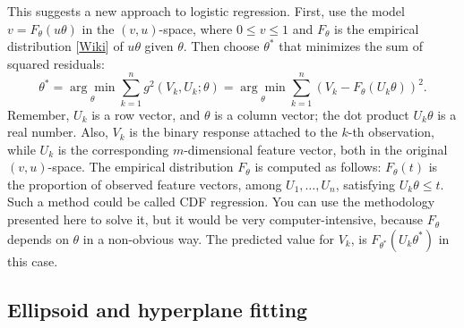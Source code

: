 \documentclass[oneside,10pt]{book}
\begin{document}
This suggests a new approach to logistic regression. First, use the model $v=F_\theta(u\theta)$ in the $(v,u)$-space, where $0\leq v\leq 1$ and 
$F_\theta$ is the
 \textcolor{index}{empirical distribution} [\href{https://en.wikipedia.org/wiki/Empirical_distribution_function}{Wiki}] of $u\theta$ given $\theta$. Then choose $\theta^*$ that minimizes the sum of squared residuals:
$$
\theta^* =\underset{\theta}{\arg\min}\sum_{k=1}^n g^2(V_k,U_k;\theta)=\underset{\theta}{\arg\min}\sum_{k=1}^n (V_k - F_\theta(U_k\theta))^2.
$$
 Remember, $U_k$ is a row vector, and $\theta$ is a column vector; the dot product $U_k\theta$ is a real number. Also,
 $V_k$ is the binary response attached to the $k$-th observation, while $U_k$ is the corresponding $m$-dimensional feature vector, both in the original 
 $(v,u)$-space. The empirical distribution $F_\theta$ is computed as follows: $F_\theta(t)$ is the proportion of observed feature vectors, among $U_1,\dots,U_n$, satisfying  $U_k\theta\leq t$.
Such a method could be called \textcolor{index}{CDF regression}. You can use the methodology presented here to solve it, but it would be very computer-intensive, because $F_\theta$ depends on $\theta$
 in a non-obvious way. The predicted value for $V_k$, is $F_{\theta^*}(U_k\theta^*)$ in this case.
 

\subsection{Ellipsoid and hyperplane fitting}
\end{document}

